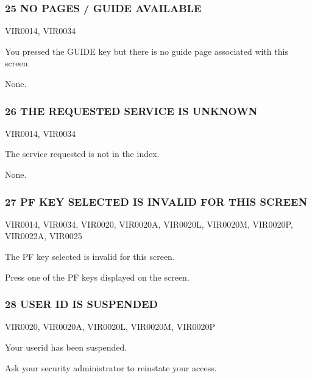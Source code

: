 \documentclass[letterpaper,10pt,english]{sphinxmanual}
\begin{document}
\subsubsection{25 NO PAGES / GUIDE AVAILABLE}
\label{\detokenize{messages:no-pages-guide-available}}\begin{description}
\sphinxAtStartPar
VIR0014, VIR0034

\sphinxAtStartPar
You pressed the GUIDE key but there is no guide page associated with this screen.

\sphinxAtStartPar
None.

\end{description}


\subsubsection{26 THE REQUESTED SERVICE IS UNKNOWN}
\label{\detokenize{messages:the-requested-service-is-unknown}}\begin{description}
\sphinxAtStartPar
VIR0014, VIR0034

\sphinxAtStartPar
The service requested is not in the index.

\sphinxAtStartPar
None.

\end{description}


\subsubsection{27 PF KEY SELECTED IS INVALID FOR THIS SCREEN}
\label{\detokenize{messages:pf-key-selected-is-invalid-for-this-screen}}\begin{description}
\sphinxAtStartPar
VIR0014, VIR0034, VIR0020, VIR0020A, VIR0020L, VIR0020M, VIR0020P, VIR0022A, VIR0025

\sphinxAtStartPar
The PF key selected is invalid for this screen.

\sphinxAtStartPar
Press one of the PF keys displayed on the screen.

\end{description}


\subsubsection{28 USER ID IS SUSPENDED}
\label{\detokenize{messages:user-id-is-suspended}}\begin{description}
\sphinxAtStartPar
VIR0020, VIR0020A, VIR0020L, VIR0020M, VIR0020P

\sphinxAtStartPar
Your userid has been suspended.

\sphinxAtStartPar
Ask your security administrator to reinstate your access.

\end{description}
\end{document}
